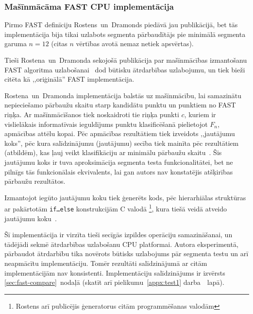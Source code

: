 \subsubsection{Mašīnmācāma FAST CPU implementācija} \label{sec:fast-original}
Pirmo FAST definīciju Rostens~un~Dramonds piedāvā jau \cite{Rosten-tracking}
publikācijā, bet tās implementācija bija tikai uzlabots segmenta
pārbaudītājs pie minimālā segmenta garuma $n=12$
(citas $n$ vērtības \cite{Rosten-tracking} avotā nemaz netiek apsvērtas).

Tieši Rostena~un~Dramonda sekojošā publikācija par mašīnmācības
izmantošanu FAST algoritma uzlabošanai~\cite{FAST} dod būtisku
ātrdarbības uzlabojumu, un tiek bieži citēta kā ,,oriģinālā'' FAST
implementācija.

Rostena~un~Dramonda\cite{FAST} implementācija balstās uz
mašīnmācību, lai samazinātu nepieciešamo pārbaužu skaitu starp
kandidātu punktu un punktiem no FAST riņķa. Ar mašīnmācīšanos tiek
noskaidroti tie riņķa punkti $c$, kuriem ir vislielākais informatīvais
ieguldījums punktu klasificēšanā pielietojot $F_n$, apmācības attēlu
kopai. Pēc apmācības rezultātiem tiek izveidots
,,jautājumu koks'', pēc kura salīdzinājumu (jautājumu) secība tiek
mainīta pēc rezultātiem (atbildēm), kas ļauj veikt klasifikāciju ar
minimālu pārbaužu skaitu~\cite{FAST}. Šis jautājumu koks ir tuva aproksimācija
segmenta testa funkcionalitātei, bet ne pilnīgs tās funkcionālais
ekvivalents, lai gan autors nav konstatējis atšķirības
pārbaužu rezultātos.

Izmantojot iegūto jautājumu koku tiek ģenerēts kods, pēc hierarhiālas
struktūras ar pakārtotām \texttt{if\ldots{}else} konstrukcijām C valodā%
\footnote{Rostens arī publicējis ģeneratorus citām programmēšanas valodām},
kura tiešā veidā atveido jautājumu koku~\cite{FAST}.

Šī implementācija ir virzīta tieši secīgās izpildes operāciju samazināšanai,
un tādējādi sekmē ātrdarbības uzlabošanu CPU platformai. Autora eksperimentā,
pārbaudot ātrdarbību tika novērots būtisks uzlabojums pār segmenta testu un
arī neapmācītu implementāciju. Tomēr rezultāti salīdzinājumā ar citām
implementācijām nav konsistenti. Implementāciju salīdzinājums ir izvērsts
\ref{sec:fast-compare}~nodaļā
(skatīt arī pielikumu~\ref{appx:test1} darba~\pageref{appx:test1}~lapā).
